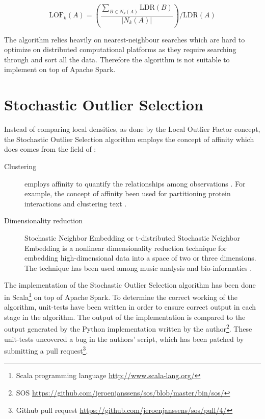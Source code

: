 \begin{equation}
\text{LOF}_{k}(A) = \left( \frac{\sum_{B \in N_{k}(A)} \text{LDR}(B)}{|N_{k}(A)|} \right) / \text{LDR}(A)
\label{eq:lof}
\end{equation}

The algorithm relies heavily on nearest-neighbour searches which are hard to optimize on distributed computational platforms as they require searching through and sort all the data. Therefore the algorithm is not suitable to implement on top of Apache Spark.

\section{Stochastic Outlier Selection \label{sec:sos}}

Instead of comparing local densities, as done by the Local Outlier Factor concept, the Stochastic Outlier Selection algorithm employs the concept of affinity which does comes from the field of \cite{ictdbid:2777,AISTATS09_Maaten}:
\begin{description}
  \item[Clustering] employs affinity to quantify the relationships among observations \cite{Frey2007}. For example, the concept of affinity been used for partitioning protein interactions \cite{pmid19331680} and clustering text \cite{10.1109/TKDE.2010.144}.
  \item[Dimensionality reduction] Stochastic Neighbor Embedding \cite{NIPS20022276} or t-distributed Stochastic Neighbor Embedding \cite{van2008visualizing,ictdbid:2777} is a nonlinear dimensionality reduction technique for embedding high-dimensional data into a space of two or three dimensions. The technique has been used among music analysis \cite{Hamel+al:2010} and bio-informatics \cite{journals/bioinformatics/WallachL09}.
\end{description}

The implementation of the Stochastic Outlier Selection algorithm has been done in Scala\footnote{Scala programming language \url{http://www.scala-lang.org/}} on top of Apache Spark. To determine the correct working of the algorithm, unit-tests have been written in order to ensure correct output in each stage in the algorithm. The output of the implementation is compared to the output generated by the Python implementation written by the author\footnote{SOS \url{https://github.com/jeroenjanssens/sos/blob/master/bin/sos/}}. These unit-tests uncovered a bug in the authors' script, which has been patched by submitting a pull request\footnote{Github pull request \url{https://github.com/jeroenjanssens/sos/pull/4/}}.

